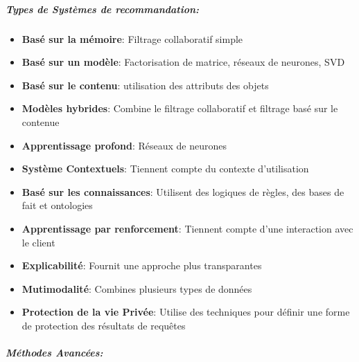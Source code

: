 \documentclass{article}
\begin{document}
\subparagraph{Types de Systèmes de recommandation:}
\begin{itemize}
    \item \textbf{Basé sur la mémoire}: Filtrage collaboratif simple
    \item \textbf{Basé sur un modèle}: Factorisation de matrice, réseaux de neurones, SVD
    \item \textbf{Basé sur le contenu}: utilisation des attributs des objets
    \item \textbf{Modèles hybrides}: Combine le filtrage collaboratif et filtrage basé sur le contenue
    \item \textbf{Apprentissage profond}: Réseaux de neurones
    \item \textbf{Système Contextuels}: Tiennent compte du contexte d'utilisation
    \item \textbf{Basé sur les connaissances}: Utilisent des logiques de règles, des bases de fait et ontologies
    \item \textbf{Apprentissage par renforcement}: Tiennent compte d'une interaction avec le client
    \item \textbf{Explicabilité}: Fournit une approche plus transparantes
    \item \textbf{Mutimodalité}: Combines plusieurs types de données
    \item \textbf{Protection de la vie Privée}: Utilise des techniques pour définir une forme de protection des résultats de requêtes
\end{itemize}

\subparagraph{Méthodes Avancées: }
\end{document}
